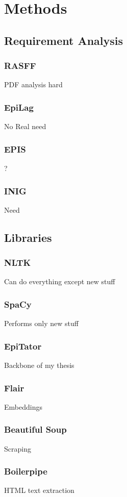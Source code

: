 \chapter{Methods}

\section{Requirement Analysis}
\subsection{RASFF}
PDF analysis hard
\subsection{EpiLag}
No Real need
\subsection{EPIS}
?
\subsection{INIG}\label{INIGsources}
Need


\section{Libraries}
\subsection{NLTK}
Can do everything except new stuff
\subsection{SpaCy}
Performs only new stuff
\subsection{EpiTator}
Backbone of my thesis
\subsection{Flair}
Embeddings
\subsection{Beautiful Soup}
Scraping
\subsection{Boilerpipe}
HTML text extraction

